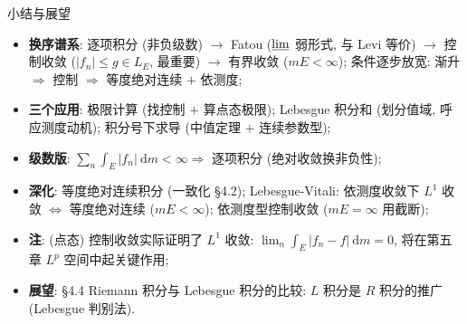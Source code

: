 \begin{frame}{小结与展望}

\begin{itemize}
\item \textbf{换序谱系}: 逐项积分 (非负级数) $\to$ Fatou ($\varliminf$ 弱形式, 与 Levi 等价)
  $\to$ \alert{控制收敛} ($|f_n| \leqslant g \in L_E$, 最重要) $\to$ 有界收敛 ($mE < \infty$);
  条件逐步放宽: 渐升 $\Rightarrow$ 控制 $\Rightarrow$ 等度绝对连续 $+$ 依测度;
\pause
\item \textbf{三个应用}: 极限计算 (找控制 $+$ 算点态极限); Lebesgue 积分和 (划分\alert{值域},
  呼应测度动机); 积分号下求导 (中值定理 $+$ 连续参数型);
\pause
\item \textbf{级数版}: $\sum_n \int_E |f_n| ~ \mathrm{d} m < \infty \Rightarrow$
  逐项积分 (绝对收敛换非负性);
\pause
\item \textbf{深化}: 等度绝对连续积分 (一致化 \S 4.2); Lebesgue-Vitali:
  依测度收敛下 $L^1$ 收敛 $\iff$ 等度绝对连续 ($mE < \infty$);
  依测度型控制收敛 ($mE = \infty$ 用截断);
\pause
\item \textbf{注}: (点态) 控制收敛实际证明了 $L^1$ 收敛:
  $\lim_n \int_E |f_n - f| ~ \mathrm{d} m = 0$, 将在第五章 $L^p$ 空间中起关键作用;
\pause
\item \textbf{展望}: \S 4.4 Riemann 积分与 Lebesgue 积分的比较:
  $L$ 积分是 $R$ 积分的推广 (Lebesgue 判别法).
\end{itemize}

\end{frame}



